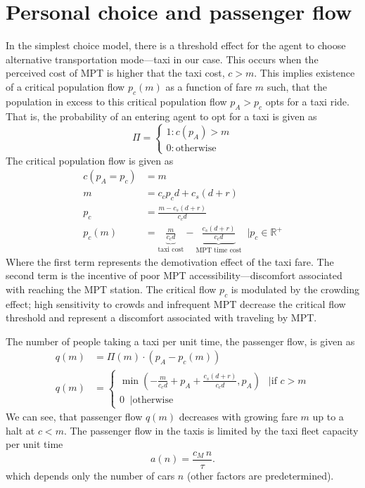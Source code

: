 \documentclass[a4paper]{report}
\begin{document}
\section{Personal choice and passenger flow}
In the simplest choice model, there is a threshold effect for the agent to choose alternative transportation mode---taxi in our case. This occurs when the perceived cost of MPT is higher that the taxi cost, $c>m$. This implies existence of a critical population flow $p_c(m)$ as a function of fare $m$ such, that the population in excess to this critical population flow $p_A>p_c$ opts for a taxi ride. That is, the probability of an entering agent to opt for a taxi is given as
\begin{equation}
\Pi=	\begin{cases}
		1: c(p_A)>m\\
		0: \text{otherwise}
	\end{cases}
\label{taxifreq}
\end{equation}
The critical population flow is given as 
\begin{align}
	c(p_A{=}p_c)&=m\nonumber\\
	m&=c_c p_c d + c_s(d+r)\nonumber\\
	p_c&= \frac{m-c_s(d+r)}{c_c d}\nonumber\\
	p_c(m)&=\underbrace{\frac{m}{c_c d}}_{\text{taxi cost}} - \underbrace{\frac{c_s(d+r)}{c_c d}}_{\text{MPT time cost}} \;\; |p_c\in \mathbb{R^{+}}\label{eq:criticalpopulation}
\end{align}%
Where the first term represents the demotivation effect of the taxi fare. The second term is the incentive of poor MPT accessibility---discomfort associated with reaching the MPT station. The critical flow $p_c$ is modulated by the crowding effect; high sensitivity to crowds and infrequent MPT decrease the critical flow threshold and represent a discomfort associated with traveling by MPT.%

The number of people taking a taxi per unit time, the passenger flow, is given as
\begin{align}
	q(m)&=\Pi(m) \cdot(p_A-p_c(m))\\ \label{eq:passangerflow}
	q(m)&=\begin{cases}
			\min\left(-\frac{m}{c_c d}+p_A+\frac{c_s(d+r)}{c_c d},p_A\right)\;\;\ |\text{if } c>m \nonumber\\
			0\;\; |\text{otherwise}
		\end{cases}			
\end{align}
We can see, that passenger flow $q(m)$ decreases with growing fare $m$ up to a halt at $c<m$.
The passenger flow in the taxis is limited by the taxi fleet capacity per unit time
\begin{equation}
	a(n)=\frac{c_M\, n}{\tau}.	\label{eq:taxicapacity}
\end{equation}
which depends only the number of cars $n$ (other factors are predetermined).%
\end{document}
